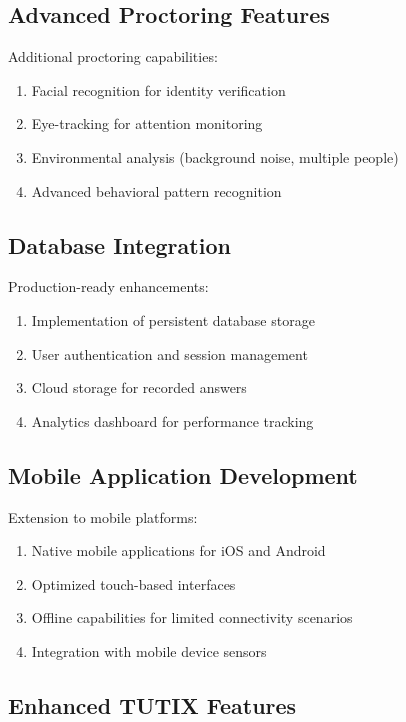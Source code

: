 \documentclass[12pt, conference]{IEEEtran}
\begin{document}
\subsection{Advanced Proctoring Features}

Additional proctoring capabilities:
\begin{enumerate}
    \item Facial recognition for identity verification
    \item Eye-tracking for attention monitoring
    \item Environmental analysis (background noise, multiple people)
    \item Advanced behavioral pattern recognition
\end{enumerate}

\subsection{Database Integration}

Production-ready enhancements:
\begin{enumerate}
    \item Implementation of persistent database storage
    \item User authentication and session management
    \item Cloud storage for recorded answers
    \item Analytics dashboard for performance tracking
\end{enumerate}

\subsection{Mobile Application Development}

Extension to mobile platforms:
\begin{enumerate}
    \item Native mobile applications for iOS and Android
    \item Optimized touch-based interfaces
    \item Offline capabilities for limited connectivity scenarios
    \item Integration with mobile device sensors
\end{enumerate}

\subsection{Enhanced TUTIX Features}
\end{document}
